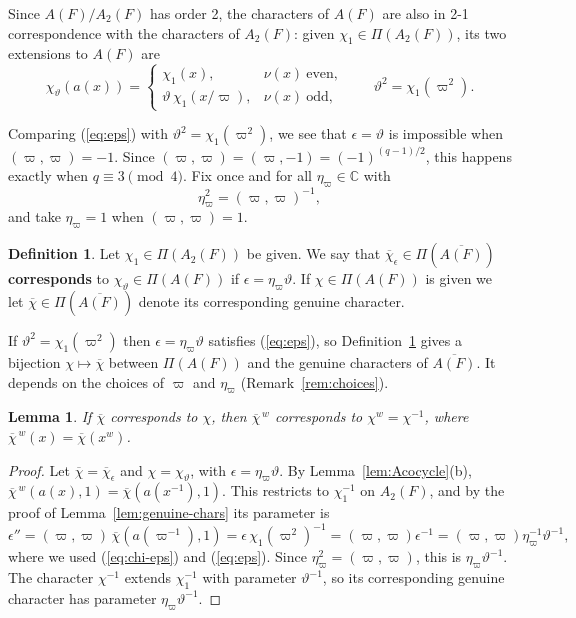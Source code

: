 \documentclass[12pt,letterpaper,openany]{book}
\theoremstyle{plain}
\newtheorem{lemma}[theorem]{Lemma}
\theoremstyle{definition}
\newtheorem{definition}[theorem]{Definition}
\theoremstyle{remark}
\theoremstyle{remark}
\begin{document}
Since $A(F)/A_2(F)$ has order 2, the characters of $A(F)$ are
also in 2-1 correspondence with the characters of $A_2(F)$:
given $\chi_1\in \Pi(A_2(F))$, its two extensions to $A(F)$ are
\begin{equation}\label{eq:chi-theta}
\chi_\vartheta (a(x))=
\left\{
\begin{array}{ll}
\chi_1(x), & \nu(x)\ \text{even},\\
\vartheta\, \chi_1(x/\varpi), & \nu(x)\ \text{odd},
\end{array}
\right.
\qquad \vartheta^2 = \chi_1(\varpi^2).
\end{equation}

Comparing (\ref{eq:eps}) with $\vartheta^2=\chi_1(\varpi^2)$, we see that
$\epsilon=\vartheta$ is impossible when $(\varpi,\varpi)=-1$. Since
$(\varpi,\varpi)=(\varpi,-1)=(-1)^{(q-1)/2}$, this happens exactly when
$q\equiv 3\pmod 4$. Fix once and for all $\eta_\varpi\in{\mathbb C}$ with
\[
\eta_\varpi^2=(\varpi,\varpi)^{-1},
\]
and take $\eta_\varpi=1$ when $(\varpi,\varpi)=1$.

\begin{definition} Let $\chi_1\in \Pi(A_2(F))$ be given.
We say that
$\overline{\chi}_\epsilon\in \Pi(\overline{A(F)})$ {\bf corresponds}
to $\chi_\vartheta \in \Pi(A(F))$ if $\epsilon =\eta_\varpi\vartheta$.
If $\chi \in \Pi(A(F))$ is given we let
$\overline{\chi}\in \Pi(\overline{A(F)})$ denote
its corresponding genuine character.
\label{def:corrchar}
\end{definition}

If $\vartheta^2=\chi_1(\varpi^2)$ then $\epsilon=\eta_\varpi\vartheta$
satisfies (\ref{eq:eps}), so Definition~\ref{def:corrchar} gives a
bijection $\chi\mapsto\overline{\chi}$ between $\Pi(A(F))$ and the genuine
characters of $\overline{A(F)}$. It depends on the choices of $\varpi$
and $\eta_\varpi$ (Remark~\ref{rem:choices}).

\begin{lemma}\label{lem:Wequiv}
If $\overline\chi$ corresponds to $\chi$, then $\overline\chi^{\,w}$
corresponds to $\chi^w=\chi^{-1}$, where
$\overline\chi^{\,w}(x)=\overline\chi(x^w)$.
\end{lemma}

\begin{proof}
Let $\overline\chi=\overline\chi_\epsilon$ and $\chi=\chi_\vartheta$, with
$\epsilon=\eta_\varpi\vartheta$. By Lemma~\ref{lem:Acocycle}(b),
$\overline\chi^{\,w}(a(x),1)=\overline\chi(a(x^{-1}),1)$. This restricts to
$\chi_1^{-1}$ on $A_2(F)$, and by the proof of
Lemma~\ref{lem:genuine-chars} its parameter is
\[
\epsilon''=(\varpi,\varpi)\,\overline\chi(a(\varpi^{-1}),1)
=\epsilon\,\chi_1(\varpi^2)^{-1}=(\varpi,\varpi)\epsilon^{-1}
=(\varpi,\varpi)\eta_\varpi^{-1}\vartheta^{-1},
\]
where we used (\ref{eq:chi-eps}) and (\ref{eq:eps}). Since
$\eta_\varpi^2=(\varpi,\varpi)$, this is $\eta_\varpi\vartheta^{-1}$. The
character $\chi^{-1}$ extends $\chi_1^{-1}$ with parameter
$\vartheta^{-1}$, so its corresponding genuine character has parameter
$\eta_\varpi\vartheta^{-1}$.
\end{proof}
\end{document}
